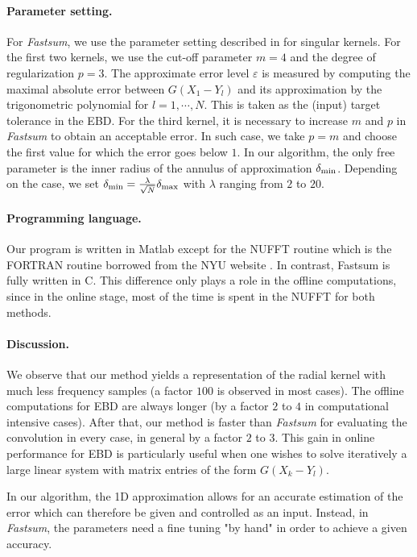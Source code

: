 \documentclass[smallextended]{svjour3}
\begin{document}
\paragraph{Parameter setting.}
For \textit{Fastsum}, we use the parameter setting described in \cite{potts2004fast} for singular kernels. For the first two kernels, we use the cut-off parameter $m= 4$ and the degree of regularization $p = 3$. The approximate error level $\varepsilon$ is measured by computing the maximal absolute error between $G(X_1 - Y_l)$ and its approximation by the trigonometric polynomial for $l = 1, \cdots, N$. This is taken as the (input) target tolerance in the EBD. For the third kernel, it is necessary to increase $m$ and $p$ in \textit{Fastsum} to obtain an acceptable error. In such case, we take $p = m$ and choose the first value for which the error goes below $1$. In our algorithm, the only free parameter is the inner radius of the annulus of approximation $\delta_{\min}$. Depending on the case, we set $\delta_{\min} = \frac{\lambda}{\sqrt{N}} \delta_{\max}$ with $\lambda$ ranging from $2$ to $20$. 

\paragraph{Programming language.}
	Our program is written in Matlab except for the NUFFT routine which is the FORTRAN routine borrowed from the NYU website \cite{NUFFTGg}. In contrast, Fastsum is fully written in C. This difference only plays a role in the offline computations, since in the online stage, most of the time is spent in the NUFFT for both methods. 
\paragraph{Discussion.}
We observe that our method yields a representation of the radial kernel with much less frequency samples (a factor $100$ is observed in most cases). The offline computations for EBD are always longer (by a factor $2$ to $4$ in computational intensive cases). After that, our method is faster than \textit{Fastsum} for evaluating the convolution in every case, in general by a factor $2$ to $3$. This gain in online performance for EBD is particularly useful when one wishes to solve iteratively a large linear system with matrix entries of the form $G(X_k - Y_l)$. 

In our algorithm, the 1D approximation allows for an accurate estimation of the error which can therefore be given and controlled as an input. Instead, in \textit{Fastsum}, the parameters need a fine tuning "by hand" in order to achieve a given accuracy. 
\end{document}
